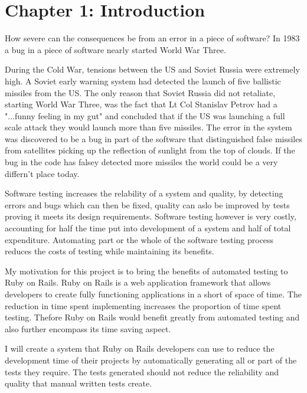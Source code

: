 \documentclass{article}
\begin{document}
\newpage
\tableofcontents

\newpage	
{}
\section{Chapter 1: Introduction}
\par How severe can the consequences be from an error in a piece of software? In 1983 a bug in a piece of software nearly started World War Three.
\vspace{5mm}
\par During the Cold War, tensions between the US and Soviet Russia were extremely high. A Soviet early warning system had detected the launch of five ballistic missiles from the US. The only reason that Soviet Russia did not retaliate, starting World War Three, was the fact that Lt Col Stanislav Petrov had a "...funny feeling in my gut"\cite{ZDNetDisasters} and concluded that if the US was launching a full scale attack they would launch more than five missiles. The error in the system was discovered to be a bug in part of the software that distinguished false missiles from satellites picking up the reflection of sunlight from the top of clouds.\cite{ZDNetDisasters} If the bug in the code has falsey detected more missiles the world could be a very differn't place today.
\vspace{5mm}
\par Software testing increases the relability of a system and quality, by detecting errors and bugs which can then be fixed, quality can aslo be improved by tests proving it meets its design requirements. Software testing however is very costly, accounting for half the time put into development of a system and half of total expenditure.\cite{myers2011art} Automating part or the whole of the software testing process reduces the costs of testing while maintaining its benefits.
\vspace{5mm}
\par My motivation for this project is to bring the benefits of automated testing to Ruby on Rails. Ruby on Rails is a web application framework that allows developers to create fully functioning applications in a short of space of time. The reduction in time spent implementing increases the proportion of time spent testing. Thefore Ruby on Rails would benefit greatly from automated testing and also further encompass its time saving aspect.
\par I will create a system that Ruby on Rails developers can use to reduce the development time of their projects by automatically generating all or part of the tests they require. The tests generated should not reduce the reliability and quality that manual written tests create.
\end{document}
